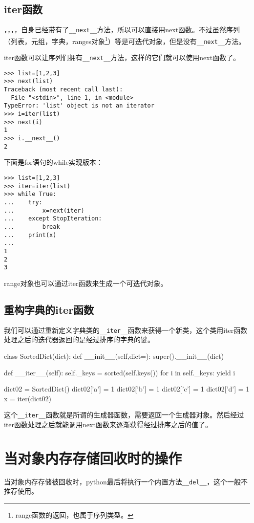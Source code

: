 \documentclass[12pt,oneside]{book}
\begin{document}
\begin{common-format}
\subsection{iter函数}
，，，，自身已经带有了\verb+__next__+方法，所以可以直接用next函数。不过虽然序列（列表，元组，字典，ranges对象\footnote{range函数的返回，也属于序列类型。}）等是可迭代对象，但是没有\verb+__next__+方法。

iter函数可以让序列们拥有\verb+__next__+方法，这样的它们就可以使用next函数了。

\begin{Verbatim}
>>> list=[1,2,3]
>>> next(list)
Traceback (most recent call last):
  File "<stdin>", line 1, in <module>
TypeError: 'list' object is not an iterator
>>> i=iter(list)
>>> next(i)
1
>>> i.__next__()
2
\end{Verbatim}

下面是for语句的while实现版本：
\begin{Verbatim}
>>> list=[1,2,3]
>>> iter=iter(list)
>>> while True:
...    try:
...        x=next(iter)
...    except StopIteration:
...        break
...    print(x)
... 
1
2
3
\end{Verbatim}

range对象也可以通过iter函数来生成一个可迭代对象。

\subsection{重构字典的iter函数}
我们可以通过重新定义字典类的\verb+__iter__+函数来获得一个新类，这个类用iter函数处理之后的迭代器返回的是经过排序的字典的键。
\begin{tcbpython}[]
class SortedDict(dict):
    def __init__(self,dict={}):
        super().__init__(dict)

    def __iter__(self):
        self._keys = sorted(self.keys())
        for i in self._keys:
            yield i

dict02 = SortedDict()
dict02['a'] = 1
dict02['b'] = 1
dict02['c'] = 1
dict02['d'] = 1
x = iter(dict02)
\end{tcbpython}
这个\verb+__iter__+函数就是所谓的生成器函数，需要返回一个生成器对象。然后经过iter函数处理之后就能调用next函数来逐渐获得经过排序之后的值了。





\section{当对象内存存储回收时的操作}
当对象内存存储被回收时，python最后将执行一个内置方法\verb+__del__+，这个一般不推荐使用。


\end{common-format}
\end{document}
